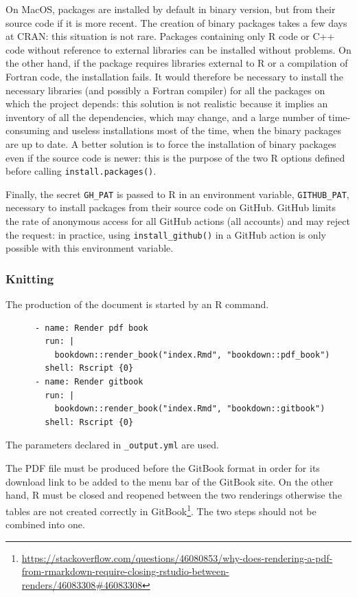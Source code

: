 \documentclass[
  12pt,
  american,
  a4paper,
  extrafontsizes,onecolumn,openright
  ]{memoir}
\newlength{\rf}
\begin{document}
On MacOS, packages are installed by default in binary version, but from their source code if it is more recent.
The creation of binary packages takes a few days at CRAN: this situation is not rare.
Packages containing only R code or C++ code without reference to external libraries can be installed without problems.
On the other hand, if the package requires libraries external to R or a compilation of Fortran code, the installation fails.
It would therefore be necessary to install the necessary libraries (and possibly a Fortran compiler) for all the packages on which the project depends: this solution is not realistic because it implies an inventory of all the dependencies, which may change, and a large number of time-consuming and useless installations most of the time, when the binary packages are up to date.
A better solution is to force the installation of binary packages even if the source code is newer: this is the purpose of the two R options defined before calling \texttt{install.packages()}.

Finally, the secret \texttt{GH\_PAT} is passed to R in an environment variable, \texttt{GITHUB\_PAT}, necessary to install packages from their source code on GitHub.
GitHub limits the rate of anonymous access for all GitHub actions (all accounts) and may reject the request: in practice, using \texttt{install\_github()} in a GitHub action is only possible with this environment variable.

\subsubsection{Knitting}\label{knitting}

The production of the document is started by an R command.

\begin{verbatim}
      - name: Render pdf book
        run: |
          bookdown::render_book("index.Rmd", "bookdown::pdf_book")
        shell: Rscript {0}
      - name: Render gitbook
        run: |
          bookdown::render_book("index.Rmd", "bookdown::gitbook")
        shell: Rscript {0}
\end{verbatim}

The parameters declared in \texttt{\_output.yml} are used.

The PDF file must be produced before the GitBook format in order for its download link to be added to the menu bar of the GitBook site.
On the other hand, R must be closed and reopened between the two renderings otherwise the tables are not created correctly in GitBook\footnote{\url{https://stackoverflow.com/questions/46080853/why-does-rendering-a-pdf-from-rmarkdown-require-closing-rstudio-between-renders/46083308\#46083308}}.
The two steps should not be combined into one.
\end{document}
